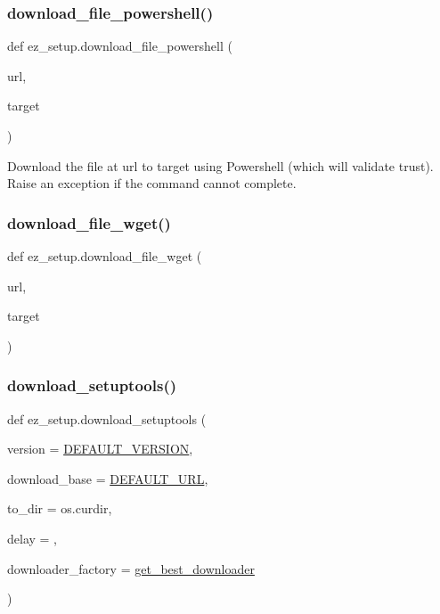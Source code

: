 \subsubsection{\texorpdfstring{download\+\_\+file\+\_\+powershell()}{download\_file\_powershell()}}
{\footnotesize\ttfamily def ez\+\_\+setup.\+download\+\_\+file\+\_\+powershell (\begin{DoxyParamCaption}\item[{}]{url,  }\item[{}]{target }\end{DoxyParamCaption})}

\begin{DoxyVerb}Download the file at url to target using Powershell (which will validate
trust). Raise an exception if the command cannot complete.
\end{DoxyVerb}
 \mbox{\label{namespaceez__setup_af87aff324e74dd596c88cbbb05bdc0a0}} 
\subsubsection{\texorpdfstring{download\+\_\+file\+\_\+wget()}{download\_file\_wget()}}
{\footnotesize\ttfamily def ez\+\_\+setup.\+download\+\_\+file\+\_\+wget (\begin{DoxyParamCaption}\item[{}]{url,  }\item[{}]{target }\end{DoxyParamCaption})}

\mbox{\label{namespaceez__setup_ad41db6464296e12f487740425f92091d}} 
\subsubsection{\texorpdfstring{download\+\_\+setuptools()}{download\_setuptools()}}
{\footnotesize\ttfamily def ez\+\_\+setup.\+download\+\_\+setuptools (\begin{DoxyParamCaption}\item[{}]{version = {\ttfamily \hyperlink{namespaceez__setup_aa031ee965f5310beedcd57236385d518}{D\+E\+F\+A\+U\+L\+T\+\_\+\+V\+E\+R\+S\+I\+ON}},  }\item[{}]{download\+\_\+base = {\ttfamily \hyperlink{namespaceez__setup_a8096341ad5ff1c048779efc8668fe864}{D\+E\+F\+A\+U\+L\+T\+\_\+\+U\+RL}},  }\item[{}]{to\+\_\+dir = {\ttfamily os.curdir},  }\item[{}]{delay = {},  }\item[{}]{downloader\+\_\+factory = {\ttfamily \hyperlink{namespaceez__setup_a37c9e523f99cd7b5cfd01eada43de9ad}{get\+\_\+best\+\_\+downloader}} }\end{DoxyParamCaption})}


